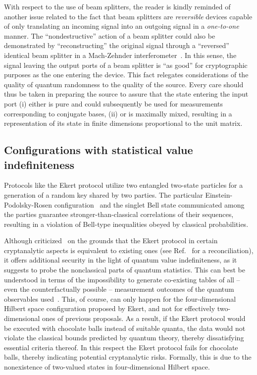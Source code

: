 \documentclass[%
 preprint,
 showpacs,
 showkeys,
 preprintnumbers,
 amsmath,amssymb,
 aps,
 pra,
  longbibliography,
 ]{revtex4-1}
\begin{document}
With respect to the use of beam splitters, the reader is kindly reminded of another
issue related to the fact that beam splitters are {\em reversible} devices capable of only
translating an incoming  signal into an outgoing  signal in a {\em one-to-one} manner.
The ``nondestructive'' action of a beam splitter could also be demonstrated
by ``reconstructing'' the original signal through a ``reversed'' identical beam splitter
in a Mach-Zehnder interferometer~\cite{green-horn-zei}.
In this sense, the signal leaving the output ports of a beam splitter
is ``as good'' for cryptographic purposes as the one entering the device.
This fact relegates considerations of the quality of quantum randomness
to the quality of the source. Every care should thus be taken in preparing the source
to  assure that the state entering the input port
(i)  either is pure and could subsequently be used for measurements corresponding to conjugate bases,
(ii) or is maximally mixed, resulting in a representation of its
state in finite dimensions proportional to the unit matrix.

\subsection{Configurations with statistical value indefiniteness}

Protocols like the Ekert protocol \cite{ekert91}
utilize two entangled two-state particles for a generation of
a random key shared by two parties. The particular Einstein-Podolsky-Rosen
configuration~\cite{epr} and the singlet Bell state communicated among the
parties guarantee  stronger-than-classical correlations of their sequences,
resulting in a violation of Bell-type inequalities obeyed by classical probabilities.

Although criticized~\cite{PhysRevLett.68.557} on the grounds that the Ekert protocol
in certain cryptanalytic aspects is equivalent to existing ones
(see Ref.~\cite{benn-92b} for a reconciliation),
it offers additional security in the light of quantum value indefiniteness,
as it suggests to probe the nonclassical parts of quantum statistics.
This can best be understood in terms of the impossibility to generate
co-existing tables of all -- even the counterfactually possible -- measurement outcomes
of the quantum observables used~\cite{peres222}.
This, of course, can only happen for the four-dimensional Hilbert space configuration
proposed by Ekert,
and not for effectively two-dimensional ones of previous proposals.
As a result, if the Ekert protocol would be executed with chocolate balls instead of suitable quanta,
the data would not violate the classical bounds predicted by quantum theory, thereby dissatisfying essential criteria thereof.
In this respect the Ekert protocol fails for chocolate balls, thereby indicating potential cryptanalytic risks.
Formally, this is due to the nonexistence of two-valued states
in four-dimensional Hilbert space.
\end{document}
